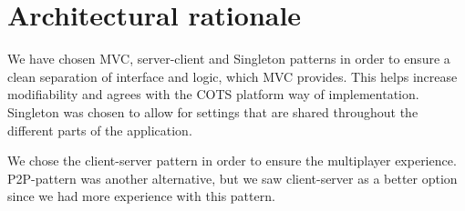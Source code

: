 \section{Architectural rationale} 
\label{sec:architecturalrationale}

We have chosen MVC, server-client and Singleton patterns in order to ensure a clean separation of interface and logic, which MVC provides. This helps increase modifiability and agrees with the COTS platform way of implementation. Singleton was chosen to allow for settings that are shared throughout the different parts of the application. 

We chose the client-server pattern in order to ensure the multiplayer experience. P2P-pattern was another alternative, but we saw client-server as a better option since we had more experience with this pattern. 